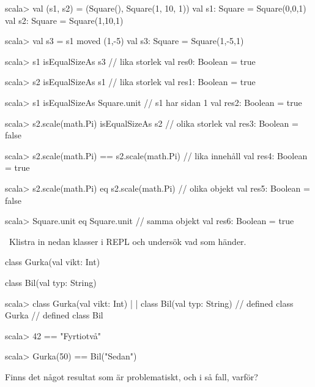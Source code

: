 \SubtaskSolved
\begin{REPL}
scala> val (s1, s2) = (Square(), Square(1, 10, 1))
val s1: Square = Square(0,0,1)
val s2: Square = Square(1,10,1)

scala> val s3 = s1 moved (1,-5)
val s3: Square = Square(1,-5,1)

scala> s1 isEqualSizeAs s3       // lika storlek
val res0: Boolean = true

scala> s2 isEqualSizeAs s1       // lika storlek
val res1: Boolean = true

scala> s1 isEqualSizeAs Square.unit   // s1 har sidan 1
val res2: Boolean = true

scala> s2.scale(math.Pi) isEqualSizeAs s2  // olika storlek
val res3: Boolean = false

scala> s2.scale(math.Pi) == s2.scale(math.Pi) // lika innehåll
val res4: Boolean = true

scala> s2.scale(math.Pi) eq s2.scale(math.Pi)  // olika objekt
val res5: Boolean = false

scala> Square.unit eq Square.unit   // samma objekt
val res6: Boolean = true
\end{REPL}

\QUESTEND




\clearpage

\AdvancedTasks %


\QUESTBEGIN

\Task \what~Klistra in nedan klasser i REPL och undersök vad som händer.

\begin{Code}
class Gurka(val vikt: Int)

class Bil(val typ: String)
\end{Code}

\begin{REPL}
scala> class Gurka(val vikt: Int)
     |
     | class Bil(val typ: String)
// defined class Gurka
// defined class Bil

scala> 42 == "Fyrtiotvå"

scala> Gurka(50) == Bil("Sedan")

\end{REPL}

Finns det något resultat som är problematiskt, och i så fall, varför?


\SOLUTION

